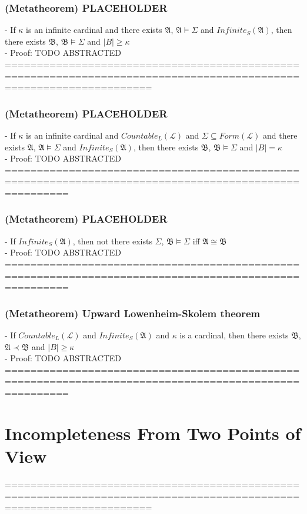 \documentclass{book}
\begin{document}
\subsection{(Metatheorem) PLACEHOLDER} %
	- If $\kappa$ is an infinite cardinal and there exists $\mathfrak{A}$, $\mathfrak{A} \vDash \Sigma$ and $Infinite_S(\mathfrak{A})$, then there exists $\mathfrak{B}$, $\mathfrak{B} \vDash \Sigma$ and $|B| \geq \kappa$ \\
	- Proof: TODO ABSTRACTED \\
	===================================================================================================================
\subsection{(Metatheorem) PLACEHOLDER} %
	- If $\kappa$ is an infinite cardinal and $Countable_L(\mathcal{L})$ and $\Sigma \subseteq Form(\mathcal{L})$ and there exists $\mathfrak{A}$, $\mathfrak{A} \vDash \Sigma$ and $Infinite_S(\mathfrak{A})$, then there exists $\mathfrak{B}$, $\mathfrak{B} \vDash \Sigma$ and $|B| = \kappa$ \\
	- Proof: TODO ABSTRACTED \\
	======================================================================================================
\subsection{(Metatheorem) PLACEHOLDER} %
	- If $Infinite_S(\mathfrak{A})$, then not there exists $\Sigma$, $\mathfrak{B} \vDash \Sigma$ iff $\mathfrak{A} \cong \mathfrak{B}$ \\
	- Proof: TODO ABSTRACTED \\
	======================================================================================================
\subsection{(Metatheorem) Upward Lowenheim-Skolem theorem} %
	- If $Countable_L(\mathcal{L})$ and $Infinite_S(\mathfrak{A})$ and $\kappa$ is a cardinal, then there exists $\mathfrak{B}$, $\mathfrak{A} \prec \mathfrak{B}$ and $|B| \geq \kappa$ \\
	- Proof: TODO ABSTRACTED \\
	======================================================================================================


\chapter{Incompleteness From Two Points of View}
	===================================================================================================================
\end{document}
